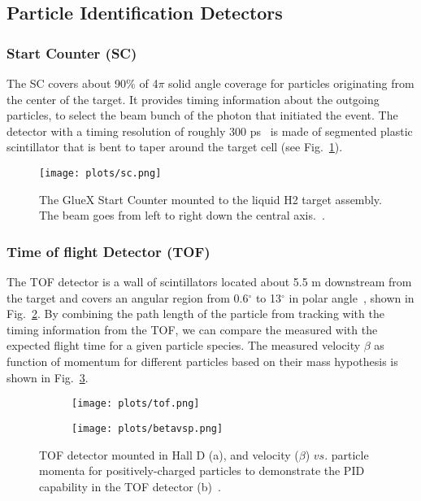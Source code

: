 {\subsection{Particle Identification Detectors}
\label{p.2.2.1}

\subsubsection{Start Counter (SC)}
The SC covers about 90$\%$ of 4$\pi$ solid angle coverage for particles originating from the center of the target. It provides timing information about the outgoing particles, to select the beam bunch of the photon that initiated the event. The detector with a timing resolution of roughly 300 ps~\cite{GlueX97} is made of segmented plastic scintillator that is bent to taper around the target cell (see Fig.~\ref{fig.2.2.1.1}).

\begin{figure}[H]
    \centering
        \texttt{[image: plots/sc.png]}
        \caption{The GlueX Start Counter mounted to the liquid H2 target assembly. The beam goes from left to right down the central axis.~\cite{GlueX97}.}
        \label{fig.2.2.1.1}
\end{figure}

\subsubsection{Time of flight Detector (TOF)}
The TOF detector is a wall of scintillators located about 5.5 m downstream from the target and covers an angular region from 0.6$^{\circ}$ to 13$^{\circ}$ in polar angle~\cite{GlueX97}, shown in Fig.~\ref{fig.2.2.1.2.a}. By combining the path length of the particle from tracking with the timing information from the TOF, we can compare the measured with the expected flight time for a given particle species. The measured velocity $\beta$ as function of momentum for different particles based on their mass hypothesis is shown in Fig.~\ref{fig.2.2.1.2.b}.

\begin{figure}[H]
    \centering
    \begin{subfigure}[H]{0.5\textwidth}
        \texttt{[image: plots/tof.png]}
        \caption{}
        \label{fig.2.2.1.2.a}
    \end{subfigure}\vfill
    \begin{subfigure}[H]{0.6\textwidth}
        \texttt{[image: plots/betavsp.png]}
        \caption{}
        \label{fig.2.2.1.2.b}
        \vspace{1pt}
    \end{subfigure}
    \caption{TOF detector mounted in Hall D (a), and velocity ($\beta$) $vs.$ particle momenta for positively-charged particles to demonstrate the PID capability in the TOF detector (b)~\cite{Ghoul16}.}
    \label{fig.4.2.2}
\end{figure}

}
